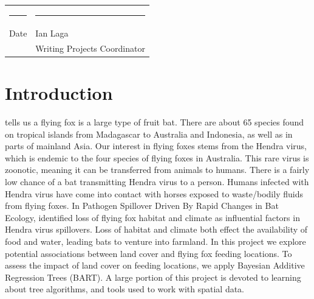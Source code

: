 \documentclass[
  12pt,
  letterpaper,
  DIV=11,
  numbers=noendperiod]{scrartcl}
\newcommand{\wprojcoord}{Ian Laga}  %
\renewcommand*\contentsname{Table of contents}
\newcommand\contentsname{Table of contents}
\begin{document}
\begin{singlespace}
\begin{titlepage}
\vspace{1cm}

\begin{center}
\begin{tabular}{ll}
\rule{2.75in}{.03in} & \rule{2.75in}{.03in} \\
Date& \wprojcoord \\
& Writing Projects Coordinator \\
\end{tabular}
\end{center}

\end{titlepage}
\end{singlespace}


\vspace{2.in}
\begin{abstract}

\end{abstract}


\newpage


\renewcommand*\contentsname{Table of contents}
{
\hypersetup{linkcolor=}
\setcounter{tocdepth}{3}
\tableofcontents
}

\newpage

\section{Introduction}\label{sec:intro}

\citep{encyclo} tells us a flying fox is a large type of fruit bat.
There are about 65 species found on tropical islands from Madagascar to
Australia and Indonesia, as well as in parts of mainland Asia. Our
interest in flying foxes stems from the Hendra virus, which is endemic
to the four species of flying foxes in Australia. This rare virus is
zoonotic, meaning it can be transferred from animals to humans. There is
a fairly low chance of a bat transmitting Hendra virus to a person.
Humans infected with Hendra virus have come into contact with horses
exposed to waste/bodily fluids from flying foxes. In Pathogen Spillover
Driven By Rapid Changes in Bat Ecology, \citep{andy_art} identified loss
of flying fox habitat and climate as influential factors in Hendra virus
spillovers. Loss of habitat and climate both effect the availability of
food and water, leading bats to venture into farmland. In this project
we explore potential associations between land cover and flying fox
feeding locations. To assess the impact of land cover on feeding
locations, we apply \citep{bart_paper} Bayesian Additive Regression
Trees (BART). A large portion of this project is devoted to learning
about tree algorithms, and tools used to work with spatial data.
\end{document}
